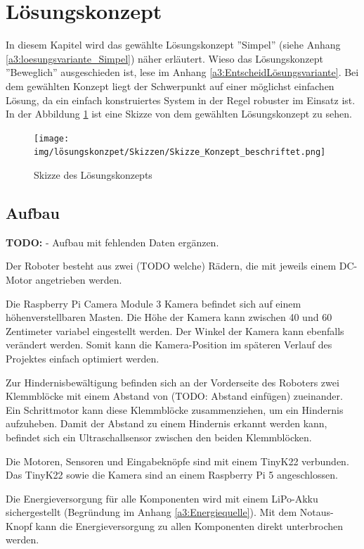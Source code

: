 \documentclass[../main.tex]{subfiles}
\begin{document}
\newpage
\section{Lösungskonzept}

In diesem Kapitel wird das gewählte Lösungskonzept ''Simpel'' (siehe Anhang \ref{a3:loesungsvariante_Simpel}) näher erläutert. Wieso das Lösungskonzept ''Beweglich'' ausgeschieden ist, lese im Anhang \ref{a3:EntscheidLösungsvariante}. Bei dem gewählten Konzept liegt der Schwerpunkt auf einer möglichst einfachen Lösung, da ein einfach konstruiertes System in der Regel robuster im Einsatz ist. In der Abbildung \ref{img:Konzept-Skizze_Fahrzeug} ist eine Skizze von dem gewählten Lösungskonzept zu sehen.

\begin{figure}[H]
\centering
\texttt{[image: img/lösungskonzpet/Skizzen/Skizze\_Konzept\_beschriftet.png]}
\caption{Skizze des Lösungskonzepts}
\label{img:Konzept-Skizze_Fahrzeug}
\end{figure}

\subsection{Aufbau}

\textbf{TODO:} 
- Aufbau mit fehlenden Daten ergänzen.  


Der Roboter besteht aus zwei (TODO welche) Rädern, die mit jeweils einem DC-Motor angetrieben werden.

Die Raspberry Pi Camera Module 3 Kamera befindet sich auf einem höhenverstellbaren Masten. Die Höhe der Kamera kann zwischen 40 und 60 Zentimeter variabel eingestellt werden. Der Winkel der Kamera kann ebenfalls verändert werden. Somit kann die Kamera-Position im späteren Verlauf des Projektes einfach optimiert werden.

Zur Hindernisbewältigung befinden sich an der Vorderseite des Roboters zwei Klemmblöcke mit einem Abstand von (TODO: Abstand einfügen) zueinander. Ein Schrittmotor kann diese Klemmblöcke zusammenziehen, um ein Hindernis aufzuheben. Damit der Abstand zu einem Hindernis erkannt werden kann, befindet sich ein Ultraschallsensor zwischen den beiden Klemmblöcken. 

Die Motoren, Sensoren und Eingabeknöpfe sind mit einem TinyK22 verbunden.
Das TinyK22 sowie die Kamera sind an einem Raspberry Pi 5 angeschlossen.

Die Energieversorgung für alle Komponenten wird mit einem LiPo-Akku sichergestellt (Begründung im Anhang \ref{a3:Energiequelle}).
Mit dem Notaus-Knopf kann die Energieversorgung zu allen Komponenten direkt unterbrochen werden.
\end{document}
